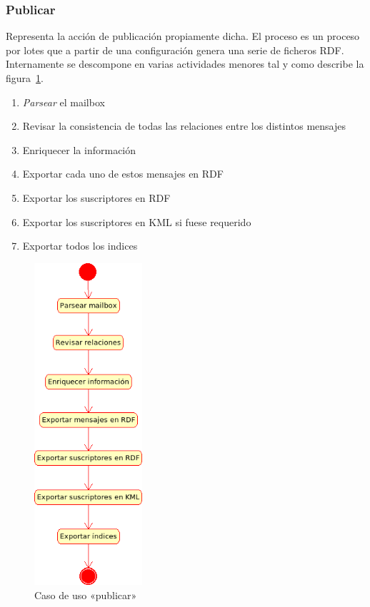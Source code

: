 \subsubsection{Publicar}

Representa la acción de publicación propiamente dicha. El proceso es un proceso por 
lotes que a partir de una configuración genera una serie de ficheros RDF. Internamente
se descompone en varias actividades menores tal y como describe la 
figura~\ref{fig:uml:publicar}.

\begin{enumerate}
 \item \emph{Parsear} el mailbox
 \item Revisar la consistencia de todas las relaciones entre los distintos mensajes
 \item Enriquecer la información
 \item Exportar cada uno de estos mensajes en RDF
 \item Exportar los suscriptores en RDF
 \item Exportar los suscriptores en KML si fuese requerido
 \item Exportar todos los indices
\end{enumerate}

\begin{figure}[ht]
 	\centering
	\includegraphics[width=4cm]{images/uml/casos-uso/publicar.png}
	\caption{Caso de uso «publicar»}
	\label{fig:uml:publicar}
\end{figure}

